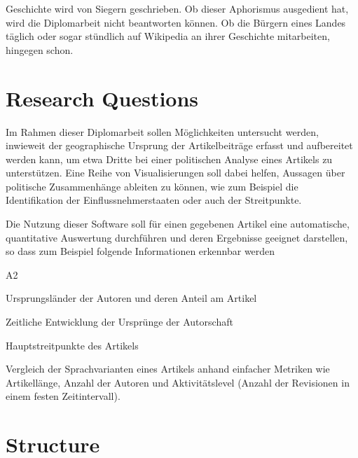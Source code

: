 
Geschichte wird von Siegern geschrieben. 
Ob dieser Aphorismus ausgedient hat, wird die Diplomarbeit nicht beantworten können.
Ob die Bürgern eines Landes täglich oder sogar stündlich auf Wikipedia an ihrer Geschichte mitarbeiten, hingegen schon.


\section{Research Questions}


Im Rahmen dieser Diplomarbeit sollen Möglichkeiten untersucht werden, inwieweit der geographische Ursprung der Artikelbeiträge erfasst und aufbereitet werden kann, um etwa Dritte bei einer politischen Analyse eines Artikels zu unterstützen.
Eine Reihe von Visualisierungen soll dabei helfen, Aussagen über politische Zusammenhänge ableiten zu können, wie zum Beispiel die Identifikation der Einflussnehmerstaaten oder auch der Streitpunkte. 


Die Nutzung dieser Software soll für einen gegebenen Artikel eine automatische, quantitative Auswertung durchführen und deren Ergebnisse geeignet darstellen, so dass zum Beispiel folgende Informationen erkennbar werden


\begin{labeling}{A2}
\item[A1] Ursprungsländer der Autoren und deren Anteil am Artikel
\item[A2] Zeitliche Entwicklung der Ursprünge der Autorschaft
\item[A3] Hauptstreitpunkte des Artikels
\item[A4] Vergleich der Sprachvarianten eines Artikels anhand einfacher Metriken wie Artikellänge, Anzahl der Autoren und Aktivitätslevel (Anzahl der Revisionen in einem festen Zeitintervall).
\end{labeling}




\section{Structure}

